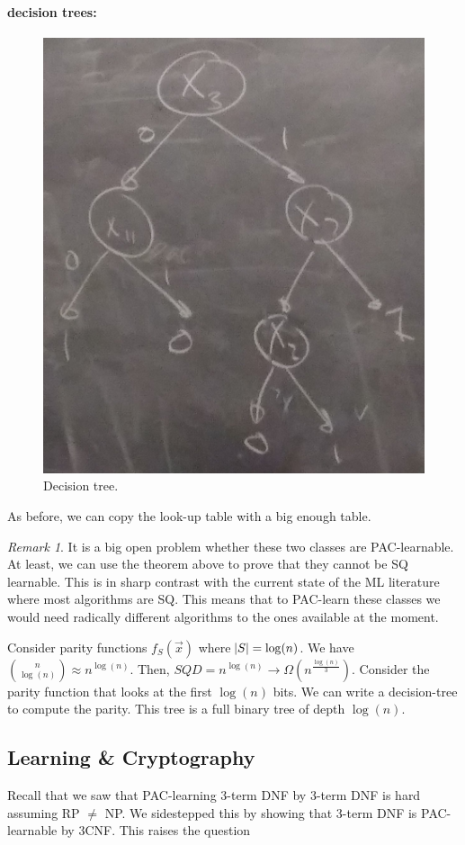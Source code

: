 \documentclass[12pt, letterpaper]{article}
\numberwithin{equation}{section} %
\theoremstyle{definition}
\theoremstyle{remark}
\newtheorem{remark}[theorem]{Remark}
\begin{document}
\paragraph{decision trees:}
\begin{figure}[H]
\centering
\includegraphics[width=0.6\linewidth]{img/tree}
\caption{Decision tree.}
\end{figure}
As before, we can copy the look-up table with a big enough table.

\begin{remark}
It is a big open problem whether these two classes are PAC-learnable. At least, we can use the theorem above to prove that they cannot be SQ learnable. This is in sharp contrast with the current state of the ML literature where most algorithms are SQ. This means that to PAC-learn these classes we would need radically different algorithms to the ones available at the moment.
\end{remark}

Consider parity functions $f_S(\vec x)$ where $\abs{S} = \log(n)$. We have $\binom{n}{\log (n)} \approx n^{\log(n)}$. Then, $SQD = n^{\log(n)} \rightarrow \Omega(n^{\frac{\log(n)}3})$. Consider the parity function that looks at the first $\log(n)$ bits. We can write a decision-tree to compute the parity.  This tree is a full binary tree of depth $\log(n)$.

\subsection{Learning \& Cryptography}
Recall that we saw that PAC-learning 3-term DNF by 3-term DNF is hard assuming RP $\ne$ NP. We sidestepped this by showing that 3-term DNF is PAC-learnable by 3CNF. This raises the question
\end{document}
